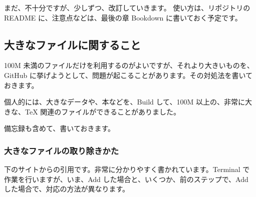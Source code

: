 \documentclass[
  xelatex, ja=standard]{bxjsbook}
\theoremstyle{definition}
\theoremstyle{definition}
\theoremstyle{definition}
\theoremstyle{definition}
\theoremstyle{remark}
\begin{document}
まだ、不十分ですが、少しずつ、改訂していきます。 使い方は、リポジトリの README に、注意点などは、最後の章 Bookdown に書いておく予定です。

\hypertarget{ux5927ux304dux306aux30d5ux30a1ux30a4ux30ebux306bux95a2ux3059ux308bux3053ux3068}{%
\subsection{大きなファイルに関すること}\label{ux5927ux304dux306aux30d5ux30a1ux30a4ux30ebux306bux95a2ux3059ux308bux3053ux3068}}

100M 未満のファイルだけを利用するのがよいですが、それより大きいものを、GitHub に挙げようとして、問題が起こることがあります。その対処法を書いておきます。

個人的には、大きなデータや、本などを、Build して、100M 以上の、非常に大きな、TeX 関連のファイルができることがありました。

備忘録も含めて、書いておきます。

\hypertarget{ux5927ux304dux306aux30d5ux30a1ux30a4ux30ebux306eux53d6ux308aux9664ux304dux304bux305f}{%
\subsubsection{大きなファイルの取り除きかた}\label{ux5927ux304dux306aux30d5ux30a1ux30a4ux30ebux306eux53d6ux308aux9664ux304dux304bux305f}}

下のサイトからの引用です。非常に分かりやすく書かれています。Terminal で作業を行いますが、いま、Add した場合と、いくつか、前のステップで、Add した場合で、対応の方法が異なります。
\end{document}

